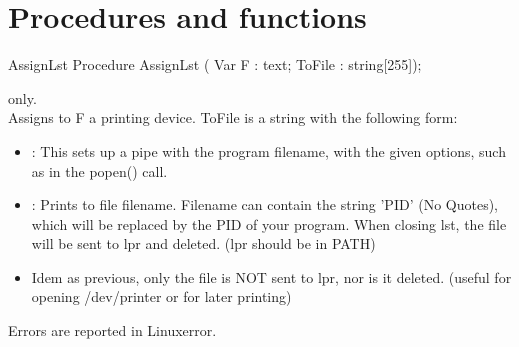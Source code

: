 \section {Procedures and functions}
\begin{procedure}{AssignLst}
\Declaration
Procedure AssignLst  ( Var F : text; ToFile : string[255]);

\Description
 \linux only. \\
 Assigns to F a printing device. ToFile is a string with the following form:
\begin{itemize}
\item {}  : This sets up a pipe with the program filename,
             with the given options, such as in the popen() call.
\item {} : Prints to file filename. Filename can contain the string 'PID'
              (No Quotes), which will be replaced by the PID of your program.
              When closing lst, the file will be sent to lpr and deleted.
              (lpr should be in PATH)
                
\item {} Idem as previous, only the file is NOT sent to lpr, nor is it
             deleted.
             (useful for opening /dev/printer or for later printing)
\end{itemize}

\Errors
 Errors are reported in Linuxerror.
\SeeAlso
{}
\end{procedure}
\latex{}
\html{}
